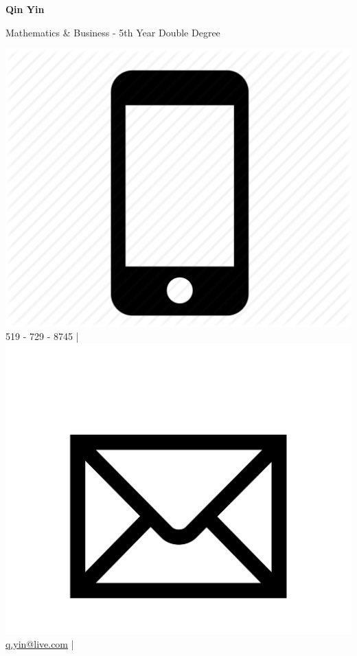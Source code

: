 \documentclass{letter}
\begin{document}
	
	\begin{center}
		{\Huge \textbf{Qin Yin}}
		
		\vspace{-3pt}
		Mathematics \& Business - 5th Year Double Degree
	
		\vspace{-5pt}
		{\small \includegraphics[scale=0.0175]{icons/phone.png} 519 - 729 - 8745 \hspace{2pt} | \hspace{2pt}
			\href{mailto:q.yin@live.com}{\includegraphics[scale=0.0065]{icons/email.png} q.yin@live.com} \hspace{2pt} | \hspace{2pt} 
}
\end{center}
\end{document}
